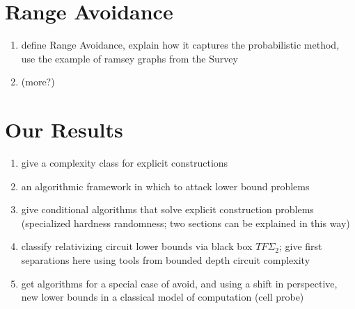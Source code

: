 \section{Range Avoidance}
\begin{enumerate}
    \item define Range Avoidance, explain how it captures the probabilistic method, use the example of ramsey graphs from the Survey
    \item (more?)
\end{enumerate}

\section{Our Results}

\begin{enumerate}
    \item give a complexity class for explicit constructions
    \item an algorithmic framework in which to attack lower bound problems
    \item give conditional algorithms that solve explicit construction problems (specialized hardness randomness; two sections can be explained in this way)
    \item classify relativizing circuit lower bounds via black box $TF\Sigma_2$; give first separations here using tools from bounded depth circuit complexity
    \item get algorithms for a special case of avoid, and using a shift in perspective, new lower bounds in a classical model of computation (cell probe)
\end{enumerate}


